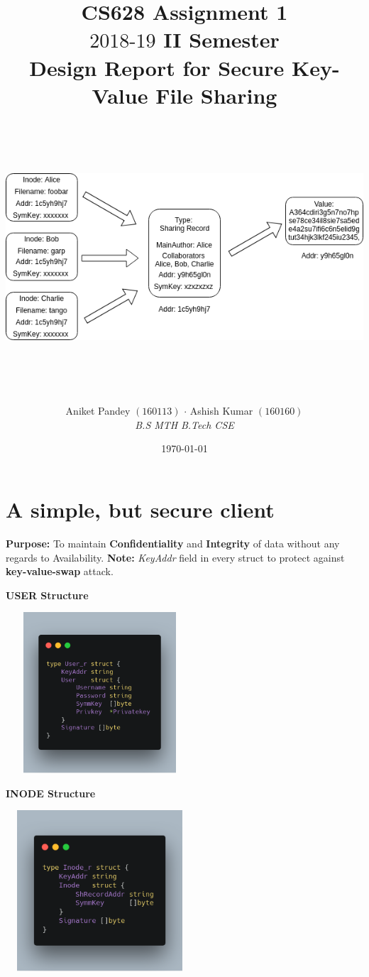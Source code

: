 \documentclass[a4paper, 12pt]{scrartcl}
\title{\vspace{10mm}CS628 Assignment 1 \\ $2018\text{-}19$  II Semester \\ \vspace{1cm} \textbf{Design Report for Secure Key-Value File Sharing}}
\subtitle{\vspace{4mm}\includegraphics[width=\textwidth, height=10cm]{images/cs628.png}\vspace{20mm}}
\author{Aniket Pandey $(160113)$ \hspace{5mm} $\cdot$ \hspace{5mm} Ashish Kumar $(160160)$ \\ \textit{B.S MTH} \hspace{45mm} \textit{B.Tech CSE}}
\date{\today}
\begin{document}
\clearpage\maketitle
\thispagestyle{empty}
\newpage


\section{A simple, but secure client}
\textbf{Purpose:} To maintain \textbf{Confidentiality} and \textbf{Integrity} of data without any regards to Availability.
\textbf{Note:} \textit{KeyAddr} field in every struct to protect against \textbf{key-value-swap} attack.

\begin{multicols}{2}

\begin{center}
	\textbf{USER Structure}
\end{center}

\begin{center}
	\includegraphics[width=7cm, height=6cm]{images/user.png}
\end{center}

\columnbreak

\begin{center}
	\textbf{INODE Structure}
\end{center}

\begin{center}
	\includegraphics[width=7cm, height=6cm]{images/inode.png}
\end{center}

\end{multicols}
\end{document}
